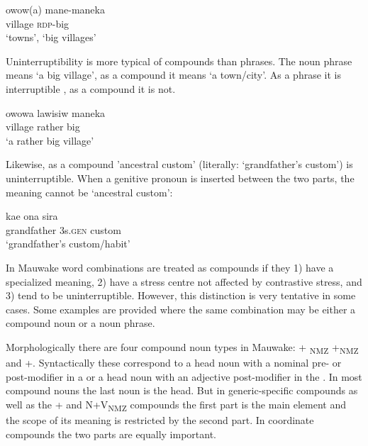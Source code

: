 \ea%
\label{ex:3:x35}
\gll owow(a) mane-maneka \\
village \textsc{rdp}-big\\
\glt`towns', `big villages'
\z

Uninterruptibility is more typical of compounds than phrases. The noun phrase  means `a big village', as a compound it means `a town/city'. As a phrase it is interruptible , as a compound it is not.

\ea%
\label{ex:3:x1768}
\gll owowa lawisiw maneka \\
village rather big\\
\glt`a rather big village'
\z

Likewise, as a compound  'ancestral custom' (literally: `grandfather's custom') is uninterruptible. When a genitive pronoun is inserted between the two parts, the meaning cannot be `ancestral custom':

\ea%
\label{ex:3:x1860}
\gll kae ona sira \\
grandfather 3s.\textsc{gen} custom\\
\glt`grandfather's custom/habit'
\z

In Mauwake word combinations are treated as compounds if they 1) have a specialized meaning, 2) have a stress centre not affected by contrastive stress, and 3) tend to be uninterruptible. However, this distinction is very tentative in some cases. Some examples are provided where the same combination may be either a compound noun or a noun phrase.

Morphologically there are four compound noun types in Mauwake: + \textsubscript{NMZ}\textstyleAcronymallcaps{} +\textsubscript{NMZ}\textstyleAcronymallcaps{ } and +. Syntactically these correspond to a head noun with a nominal pre- or post-modifier in a  or a head noun with an adjective post-modifier in the . In most compound nouns the last noun is the head. But in generic-specific compounds as well as the + and\textstyleAcronymallcaps{} \textsc{N+V}\textsubscript{NMZ} compounds the first part is the main element and the scope of its meaning is restricted by the second part. In coordinate compounds the two parts are equally important.

